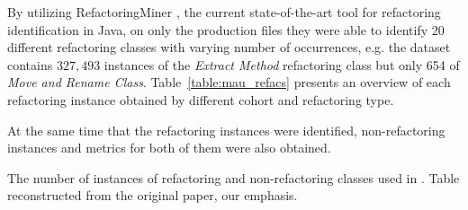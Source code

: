 By utilizing RefactoringMiner \citep{refactoringminer_2.0}, the current state-of-the-art tool for refactoring identification in Java, on only the production files they were able to identify 20 different refactoring classes with varying number of occurrences, e.g. the dataset contains $327,493$ instances of the \textit{Extract Method} refactoring class but only 654 of \textit{Move and Rename Class}. Table~\ref{table:mau_refacs} presents an overview of each refactoring instance obtained by different cohort and refactoring type.


At the same time that the refactoring instances were identified, non-refactoring instances and metrics for both of them were also obtained. 



\begin{table}[!ht]
\centering
\caption{The number of instances of refactoring and non-refactoring classes used in \citet{mauricio_paper}. Table reconstructed from the original paper, our emphasis.}
\label{table:mau_refacs}


\end{table}
